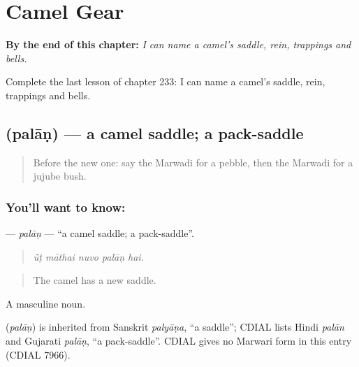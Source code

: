 
\chapter{Camel Gear}
\label{ch:mw-camel-gear}

\begin{chapteropening}
\textbf{By the end of this chapter:} \emph{I can name a camel's saddle, rein, trappings and bells.}

Complete the last lesson of chapter 233: I can name a camel's saddle, rein, trappings and bells.
\end{chapteropening}

\section[\texorpdfstring{\mw{पलाण} (palāṇ)}{पलाण (palāṇ)}]{ (palāṇ) — a camel saddle; a pack-saddle}

\label{lesson:MW-C233-palan}



\begin{quote}
Before the new one: say the Marwadi for a pebble, then the Marwadi for a jujube bush.
\end{quote}

\subsection*{You'll want to know: }
\textbf{} — \emph{palāṇ} — \textquotedblleft{}a camel saddle; a pack-saddle\textquotedblright{}.

\begin{quote}
    
\end{quote}

\begin{quote}
\emph{ū̃ṭ māthai nuvo palāṇ hai.}
\end{quote}

\begin{quote}
The camel has a new saddle.
\end{quote}

A masculine noun.

\begin{cousinweb}
\textbf{} (\emph{palāṇ}) is inherited from Sanskrit \emph{palyāṇa}, \textquotedblleft{}a saddle\textquotedblright{}; CDIAL lists Hindi \emph{palān} and Gujarati \emph{palāṇ}, \textquotedblleft{}a pack-saddle\textquotedblright{}. CDIAL gives no Marwari form in this entry (CDIAL 7966).
\end{cousinweb}

